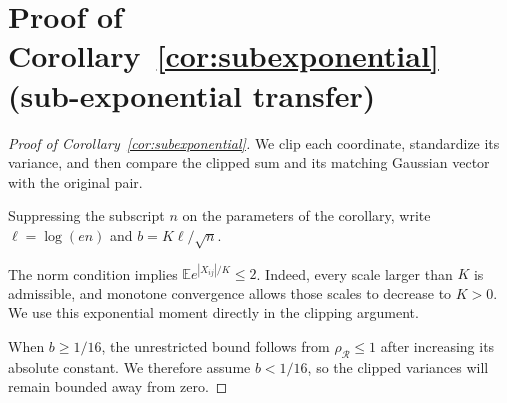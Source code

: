 \documentclass[11pt,letterpaper]{article}
\theoremstyle{remark}
\newcommand{\E}{\mathbb E}
\newcommand{\rh}{\rho_{\mathcal R}}
\begin{document}
\section{Proof of Corollary~\ref*{cor:subexponential} (sub-exponential transfer)}\label{app:subexponential}
\begin{proof}[Proof of Corollary~\ref{cor:subexponential}]

We clip each coordinate, standardize its variance, and then compare the
clipped sum and its matching Gaussian vector with the original pair.

Suppressing the subscript \(n\) on the parameters of the corollary,
write \(\ell=\log(en)\) and \(b=K\ell/\sqrt n\).

The norm condition implies \(\E e^{|X_{ij}|/K}\le2\). Indeed,
every scale larger than \(K\) is admissible, and monotone convergence
allows those scales to decrease to \(K>0\). We use this exponential
moment directly in the clipping argument.

When \(b\ge1/16\), the unrestricted bound follows from
\(\rh\le1\) after increasing its absolute constant. We therefore
assume \(b<1/16\), so the clipped variances will remain bounded
away from zero.


\end{proof}
\end{document}
